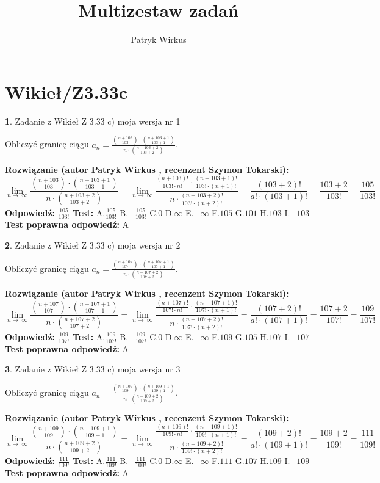 \documentclass[12pt, a4paper]{article}
\title{Multizestaw zadań}
\author{Patryk Wirkus}
\date{}
\theoremstyle{definition} %
\newtheorem{zad}{}
\newcommand{\kategoria}[1]{\section{#1}}
\newcommand{\zadStart}[1]{\begin{zad}#1\newline}
\newcommand{\zadStop}{\end{zad}}
\newcommand{\rozwStart}[2]{\noindent \textbf{Rozwiązanie (autor #1 , recenzent #2): }\newline}
\newcommand{\rozwStop}{\newline}
\newcommand{\odpStart}{\noindent \textbf{Odpowiedź:}\newline}
\newcommand{\odpStop}{\newline}
\newcommand{\testStart}{\noindent \textbf{Test:}\newline}
\newcommand{\testStop}{\newline}
\newcommand{\kluczStart}{\noindent \textbf{Test poprawna odpowiedź:}\newline}
\newcommand{\kluczStop}{\newline}
\begin{document}
\maketitle

\kategoria{Wikieł/Z3.33c}


\zadStart{Zadanie z Wikieł Z 3.33 c) moja wersja nr 1}

Obliczyć granicę ciągu $a_{n}=\frac{{n+103\choose103}\cdot{n+103+1\choose103+1}}{n\cdot{n+103+2\choose103+2}}$.
\zadStop
\rozwStart{Patryk Wirkus}{Szymon Tokarski}
$$\lim\limits_{n\to\ \infty}\frac{{n+103\choose103}\cdot{n+103+1\choose103+1}}{n\cdot{n+103+2\choose103+2}} = \lim\limits_{n\to\ \infty}\frac{\frac{(n+103)!}{103! \cdot n!}\cdot \frac{(n+103+1)!}{103! \cdot (n+1)!}}{n\cdot \frac{(n+103+2)!}{103! \cdot (n+2)!}} = \frac{(103+2)!}{a!\cdot (103+1)!} = \frac{103+2}{103!} = \frac{105}{103!}$$
\rozwStop
\odpStart
$\frac{105}{103!}$
\odpStop
\testStart
A.$\frac{105}{103!}$ B.$-\frac{105}{103!}$ C.$0$ D.$\infty$ E.$-\infty$
F.$105$ G.$101$
H.$103$
I.$-103$
\testStop
\kluczStart
A
\kluczStop



\zadStart{Zadanie z Wikieł Z 3.33 c) moja wersja nr 2}

Obliczyć granicę ciągu $a_{n}=\frac{{n+107\choose107}\cdot{n+107+1\choose107+1}}{n\cdot{n+107+2\choose107+2}}$.
\zadStop
\rozwStart{Patryk Wirkus}{Szymon Tokarski}
$$\lim\limits_{n\to\ \infty}\frac{{n+107\choose107}\cdot{n+107+1\choose107+1}}{n\cdot{n+107+2\choose107+2}} = \lim\limits_{n\to\ \infty}\frac{\frac{(n+107)!}{107! \cdot n!}\cdot \frac{(n+107+1)!}{107! \cdot (n+1)!}}{n\cdot \frac{(n+107+2)!}{107! \cdot (n+2)!}} = \frac{(107+2)!}{a!\cdot (107+1)!} = \frac{107+2}{107!} = \frac{109}{107!}$$
\rozwStop
\odpStart
$\frac{109}{107!}$
\odpStop
\testStart
A.$\frac{109}{107!}$ B.$-\frac{109}{107!}$ C.$0$ D.$\infty$ E.$-\infty$
F.$109$ G.$105$
H.$107$
I.$-107$
\testStop
\kluczStart
A
\kluczStop



\zadStart{Zadanie z Wikieł Z 3.33 c) moja wersja nr 3}

Obliczyć granicę ciągu $a_{n}=\frac{{n+109\choose109}\cdot{n+109+1\choose109+1}}{n\cdot{n+109+2\choose109+2}}$.
\zadStop
\rozwStart{Patryk Wirkus}{Szymon Tokarski}
$$\lim\limits_{n\to\ \infty}\frac{{n+109\choose109}\cdot{n+109+1\choose109+1}}{n\cdot{n+109+2\choose109+2}} = \lim\limits_{n\to\ \infty}\frac{\frac{(n+109)!}{109! \cdot n!}\cdot \frac{(n+109+1)!}{109! \cdot (n+1)!}}{n\cdot \frac{(n+109+2)!}{109! \cdot (n+2)!}} = \frac{(109+2)!}{a!\cdot (109+1)!} = \frac{109+2}{109!} = \frac{111}{109!}$$
\rozwStop
\odpStart
$\frac{111}{109!}$
\odpStop
\testStart
A.$\frac{111}{109!}$ B.$-\frac{111}{109!}$ C.$0$ D.$\infty$ E.$-\infty$
F.$111$ G.$107$
H.$109$
I.$-109$
\testStop
\kluczStart
A
\kluczStop
\end{document}
